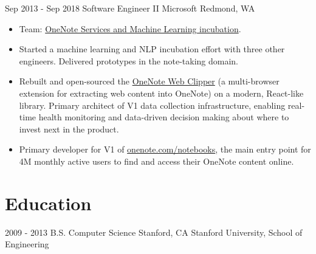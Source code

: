 \documentclass[letterpaper]{twentysecondcv} %
\begin{document}
\begin{twenty}
    	{Sep 2013 -}
		{Sep 2018}
        {Software Engineer II}
        {Microsoft}
        {Redmond, WA}
        {
        {\begin{itemize} \itemsep 2pt %
        \item Team: \href{https://www.onenote.com/}{OneNote Services and Machine Learning incubation}.
        \item Started a machine learning and NLP incubation effort with three other engineers. Delivered prototypes in the note-taking domain.
        \item Rebuilt and open-sourced the \href{https://github.com/OneNoteDev/WebClipper}{OneNote Web Clipper} (a multi-browser extension for extracting web content into OneNote) on a modern, React-like library. Primary architect of V1 data collection infrastructure, enabling real-time health monitoring and data-driven decision making about where to invest next in the product.
        \item Primary developer for V1 of \href{https://www.onenote.com/notebooks}{onenote.com/notebooks}, the main entry point for 4M monthly active users to find and access their OneNote content online.
        \end{itemize}}
        }

\end{twenty}

\section{Education}

\begin{twenty} %
	\twentyitem
    	{2009 - 2013}
		{}
        {B.S. Computer Science}
        {Stanford, CA}
        {}
        {Stanford University, School of Engineering}
\end{twenty}

\end{document}
